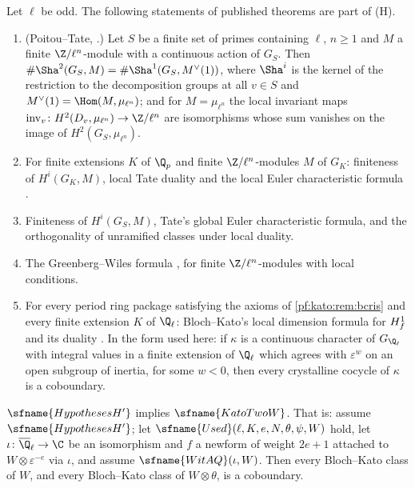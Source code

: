 \begin{hypothesis}\label{pf:kato:hyp:litcoh}
Let $\ell$ be odd. The following statements of published theorems are part of \textup{(H)}.
\begin{enumerate}[label=(\textup{\arabic*}),leftmargin=*]
\item[(PT)] (Poitou--Tate, \cite{Tate1963,Milne2006,NeukirchSchmidtWingberg2008}.) Let $S$ be a finite set of
  primes containing $\ell$, $n\ge1$ and $M$ a finite $\Z/\ell^n$-module with a continuous action of $G_S$. Then
  $\#\Sha^2(G_S,M)=\#\Sha^1(G_S,M^\vee(1))$, where $\Sha^i$ is the kernel of the restriction to the decomposition
  groups at all $v\in S$ and $M^\vee(1)=\Hom(M,\mu_{\ell^n})$; and for $M=\mu_{\ell^n}$ the local invariant maps
  $\mathrm{inv}_v\colon H^2(D_v,\mu_{\ell^n})\to\Z/\ell^n$ are isomorphisms whose sum vanishes on the image of
  $H^2(G_S,\mu_{\ell^n})$.
\item[(LF, LT, LE)] For finite extensions $K$ of $\Q_p$ and finite $\Z/\ell^n$-modules $M$ of $G_K$: finiteness of
  $H^i(G_K,M)$, local Tate duality and the local Euler characteristic formula \cite{Tate1963,Milne2006}.
\item[(GF, GE, UO)] Finiteness of $H^i(G_S,M)$, Tate's global Euler characteristic formula, and the orthogonality
  of unramified classes under local duality.
\item[(GW)] The Greenberg--Wiles formula \cite[Prop.~1.6]{Wiles1995}, \cite{DarmonDiamondTaylor1997}
  for finite $\Z/\ell^n$-modules with local conditions.
\item[(BK)] For every period ring package satisfying the axioms of \cref{pf:kato:rem:bcris} and every finite
  extension $K$ of $\Q_\ell$: Bloch--Kato's local dimension formula for $H^1_{f}$ and its duality
  \cite[\S3]{BlochKato1990}. In the form used here: if $\kappa$ is a continuous character of $G_{\Q_\ell}$ with
  integral values in a finite extension of $\Q_\ell$ which agrees with $\varepsilon^{w}$ on an open subgroup of
  inertia, for some $w<0$, then every crystalline cocycle of $\kappa$ is a coboundary.
\end{enumerate}
\end{hypothesis}

\begin{theorem}\label{pf:kato:main}
$\sfname{HypothesesH'}$ implies $\sfname{KatoTwoW}$. That is: assume $\sfname{HypothesesH'}$; let
$\sfname{Used}(\ell,K,e,N,\theta,\psi,W)$ hold, let $\iota\colon\katoQlb\to\C$ be an isomorphism and $f$ a newform of
weight $2e+1$ attached to $W\otimes\varepsilon^{-e}$ via $\iota$, and assume $\sfname{WitAQ}(\iota,W)$. Then every
Bloch--Kato class of $W$, and every Bloch--Kato class of $W\otimes\theta$, is a coboundary.
\end{theorem}

